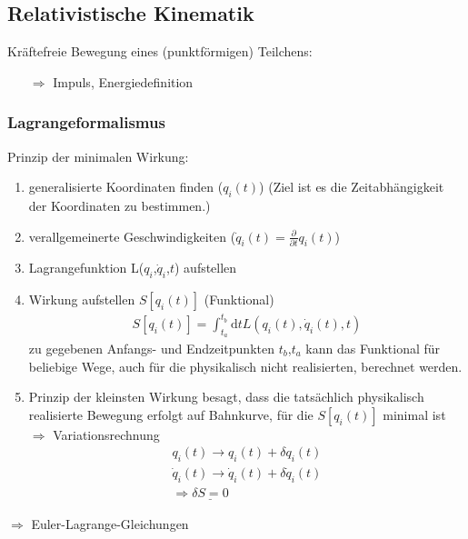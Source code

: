 \documentclass[a4paper]{article}
\begin{document}
\subsection{Relativistische Kinematik}
Kräftefreie Bewegung eines (punktförmigen) Teilchens:
\begin{itemize}
  \item[$\Rightarrow$] Impuls, Energiedefinition
\end{itemize}

\subsubsection{Lagrangeformalismus}
Prinzip der minimalen Wirkung:
\begin{enumerate}
  \item generalisierte Koordinaten finden ($q_i(t)$) (Ziel ist es die
  Zeitabhängigkeit der Koordinaten zu bestimmen.)
  \item verallgemeinerte Geschwindigkeiten
  ($\dot{q}_i(t)=\frac{\partial}{\partial t}q_i(t)$)
  \item Lagrangefunktion L($q_i$,$\dot{q}_i$,$t$) aufstellen
  \item Wirkung aufstellen $S[q_i(t)]$ (Funktional)
  \begin{align}
  S[q_i(t)]=\int_{t_a}^{t_b} \mathrm{d}t L(q_i(t),\dot{q}_i(t),t)
  \end{align}
  zu gegebenen Anfangs- und Endzeitpunkten $t_b$,$t_a$ kann das Funktional für
  beliebige Wege, auch für die physikalisch nicht realisierten, berechnet werden.
  \item Prinzip der kleinsten Wirkung besagt, dass die tatsächlich physikalisch 
  realisierte Bewegung erfolgt auf Bahnkurve, für die $S[q_i(t)]$ minimal ist
  $\Rightarrow$ Variationsrechnung 
  \begin{align}
  q_i(t)\rightarrow q_i(t)+\delta q_i(t)\\
  \dot{q}_i(t)\rightarrow \dot{q}_i(t)+\delta \dot{q}_i(t)\\
  \Rightarrow \underline{\delta S = 0}
  \end{align} 
\end{enumerate}
$\Rightarrow$ Euler-Lagrange-Gleichungen
\end{document}
